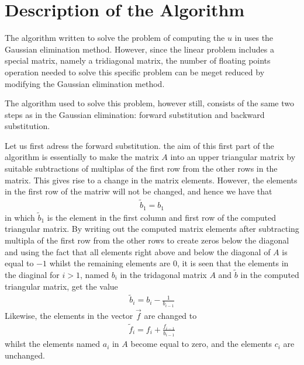 \section{Description of the Algorithm}
\label{sec:DescriptionOfTheAlgorithm}
The algorithm written to solve the problem of computing the $u$ in  uses the Gaussian elimination method. However, since the linear problem includes a special matrix, namely a tridiagonal matrix, the number of floating points operation needed to solve this specific problem can be meget reduced by modifying the Gaussian elimination method.

The algorithm used to solve this problem, however still, consists of the same two steps as in the Gaussian elimination: forward substitution and backward substitution. 

Let us first adress the forward substitution. 
the aim of this first part of the algorithm is essentially to make the matrix $A$ into an upper triangular matrix by suitable subtractions of multiplas of the first row from the other rows in the matrix. 
This gives rise to a change in the matrix elements. 
However, the elements in the first row of the matriw will not be changed, and hence we have that
\begin{align}
	\tilde{b}_1 = b_1
\end{align} 
in which $\tilde{b}_1$ is the element in the first column and first row of the computed triangular matrix.
By writing out the computed matrix elements after subtracting multipla of the first row from the other rows to create zeros below the diagonal and using the fact that all elements right above and below the diagonal of $A$ is equal to $-1$ whilst the remaining elements are $0$, it is seen that the elements in the diaginal for $i>1$, named $b_i$ in the tridagonal matrix $A$ and $\tilde{b}$ in the computed triangular matrix, get the value
\begin{align}
	\tilde{b}_i = b_i - \frac{1}{b_{i-1}}
	\label{eq:Alg1}
\end{align} 
Likewise, the elements in the vector $\vec{f}$ are changed to
\begin{align}
	\tilde{f}_i = f_i + \frac{f_{i-1}}{b_{i-1}}
	\label{eq:Alg2}
\end{align}
whilst the elements named $a_i$ in $A$ become equal to zero, and the elements $c_i$ are unchanged. 

